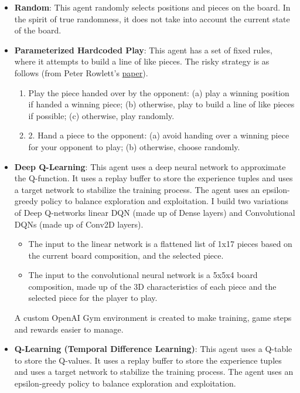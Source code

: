 \begin{itemize}
    \item \textbf{Random}: This agent randomly selects positions and pieces on the board. In the spirit of true randomness, it does not take into account the current state of the board.
    \item \textbf{Parameterized Hardcoded Play}: This agent has a set of fixed rules, where it attempts to build a line of like pieces. The risky strategy is as follows (from Peter Rowlett's \href{https://scholarworks.umt.edu/cgi/viewcontent.cgi?article=1334&context=tme}{paper}).
    \begin{enumerate}
        \item  Play the piece handed over by the opponent:  (a) play a winning position if handed a winning piece; (b) otherwise, play to build a line of like pieces if possible;  (c) otherwise, play randomly.
        \item 2. Hand a piece to the opponent: (a) avoid handing over a winning piece for your opponent to play; (b) otherwise, choose randomly.
    \end{enumerate}

    \item \textbf{Deep Q-Learning}: This agent uses a deep neural network to approximate the Q-function. It uses a replay buffer to store the experience tuples and uses a target network to stabilize the training process. The agent uses an epsilon-greedy policy to balance exploration and exploitation. I build two variations of Deep Q-networks linear DQN (made up of Dense layers) and Convolutional DQNs (made up of Conv2D layers).
    \begin{itemize}
        \item The input to the linear network is a flattened list of 1x17 pieces based on the current board composition, and the selected piece.
        \item The input to the convolutional neural network is a 5x5x4 board composition, made up of the 3D characteristics of each piece and the selected piece for the player to play.
    \end{itemize}
    A custom OpenAI Gym environment is created to make training, game steps and rewards easier to manage.

    \item \textbf{Q-Learning (Temporal Difference Learning)}: This agent uses a Q-table to store the Q-values. It uses a replay buffer to store the experience tuples and uses a target network to stabilize the training process. The agent uses an epsilon-greedy policy to balance exploration and exploitation.


\end{itemize}
